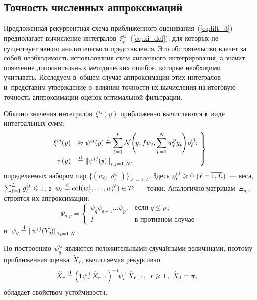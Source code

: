 \begin{multicols}{2}
 \section{Точность численных аппроксимаций}
 
 Предложенная рекуррентная схема приближенного оценивания~(\ref{eq:filt_3}) 
 предполагает вычисление интегралов~$\xi^{ij}_r$~(\ref{eq:xi_def}), 
 для которых не существует явного аналитического представления. 
 Это обстоятельство влечет за собой необходимость использования схем 
 численного интегрирования, а значит, появление дополнительных методических 
 ошибок, которые необходимо учитывать. Исследуем в~общем случае аппроксимации 
 этих интегралов и~представим утверждение о~влиянии точности их вычисления 
 на итоговую точность аппроксимации оценок оптимальной фильтрации.
  
  Обычно значения интегралов~$\xi^{ij}(y)$ приближенно вычисляются 
  в~виде интегральных сумм:
  \begin{equation}
  \left.
  \begin{array}{rl}
  \hspace*{-2mm}\xi^{ij}(y) & \displaystyle \approx \psi^{ij}(y) \eqd 
 \sum\limits_{\ell=1}^{L} \mathcal{N}\!\left(\!y,f w_{\ell},
 \sum\limits_{p=1}^N w^p_{\ell} g_p\!\right)\!\varrho_{\ell}^{ij}; \\[6pt] 
   \hspace*{-2mm}\psi(y) &\eqd \|\psi^{ij}(y)\|_{i,j=\overline{1,N}},
 \end{array}
\! \right\}\!\!
  \label{eq:int_sum}
  \end{equation}
  определяемых набором пар $\{(w_{\ell},\varrho_{\ell}^{ij})\}_{\ell=\overline{1,L}}$.
   Здесь $\varrho_{\ell}^{ij} \hm\geqslant 0$ ($\ell\hm=\overline{1,L}$)~--- 
   веса, $\sum\nolimits_{\ell=1}^L\varrho_{\ell}^{ij} \hm\leqslant 1$, 
   а~$w_{\ell}\hm\eqd \col(w^1_{\ell},\ldots,w^N_{\ell}) \hm\in \mathcal{D}$~--- точки. 
  Аналогично мат\-ри\-цам~$\Xi_{q,r}$ строятся их аппроксимации:
  $$
 \Psi_{q,p} =  
 \begin{cases}
 \psi_{q}\psi_{q+1}\ldots \psi_p, & \mbox{если }  q \leqslant p\,; \\
 I &  \mbox{в противном случае}
\end{cases}
$$
  и~$\psi_q \stackrel{\mathrm{d}}{=} \|\psi^{ij}(Y_q)\|_{ij=\overline{1,N}}$.
  
  По построению~$\psi^{ij}_q$ являются положительными случайными величинами,
   поэтому приближенная оценка~$\widetilde{X}_r$, вычисляемая рекурсивно
  \begin{equation}
   \hspace*{-2mm} \widetilde{X}_r \eqd \left(\mathbf{1}\psi_r^{\top} \widetilde{X}_{r-1}\right)^{-1}\!\!
  \psi_r^{\top} \widetilde{X}_{r-1}, \enskip 
  r\geqslant 1\,, \ \widetilde{X}_{0} = \pi,
  \label{eq:pp_est}
  \end{equation}
  обладает свойством устойчивости.
  

\end{multicols}
